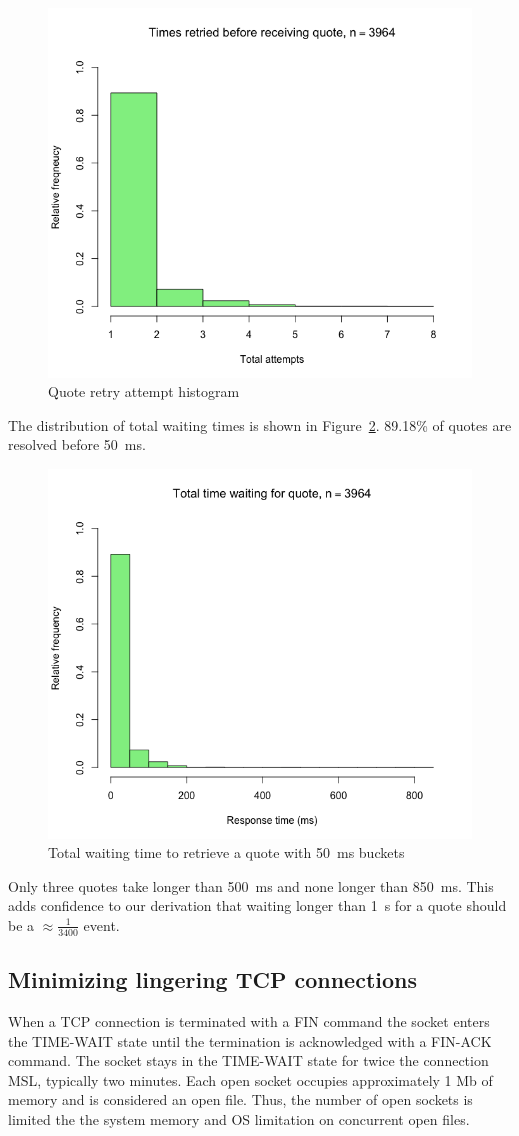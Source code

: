 \begin{figure}[tbph]
  \centering
  \includegraphics[width=0.6\linewidth]{../../data/quote-times-verification/retries}
  \caption{Quote retry attempt histogram}
  \label{fig:retries}
\end{figure}

The distribution of total waiting times is shown in Figure~\ref{fig:waiting-time}. 89.18\% of quotes are resolved before \SI{50}{\milli\second}.

\begin{figure}[tbph]
  \centering
  \includegraphics[width=0.6\linewidth]{../../data/quote-times-verification/waiting-time}
  \caption[Total waiting time to retrieve a quote]{Total waiting time to retrieve a quote with \SI{50}{\milli\second} buckets}
  \label{fig:waiting-time}
\end{figure}

Only three quotes take longer than \SI{500}{\milli\second} and none longer than \SI{850}{\milli\second}.
This adds confidence to our derivation that waiting longer than \SI{1}{\second} for a quote should be a $\approx \frac{1}{3400}$ event.

\subsection{Minimizing lingering TCP connections}
When a TCP connection is terminated with a FIN command the socket enters the TIME-WAIT state until the termination is acknowledged with a FIN-ACK command.
The socket stays in the TIME-WAIT state for twice the connection MSL, typically two minutes.
Each open socket occupies approximately 1 Mb of memory and is considered an open file.
Thus, the number of open sockets is limited the the system memory and OS limitation on concurrent open files.

